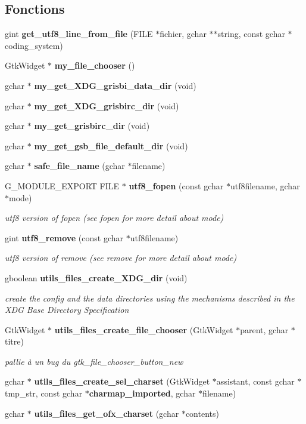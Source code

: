 \subsection*{Fonctions}
\begin{DoxyCompactItemize}
\item 
gint {\bf get\_\-utf8\_\-line\_\-from\_\-file} (FILE $\ast$fichier, gchar $\ast$$\ast$string, const gchar $\ast$coding\_\-system)
\item 
GtkWidget $\ast$ {\bf my\_\-file\_\-chooser} ()
\item 
gchar $\ast$ {\bf my\_\-get\_\-XDG\_\-grisbi\_\-data\_\-dir} (void)
\item 
gchar $\ast$ {\bf my\_\-get\_\-XDG\_\-grisbirc\_\-dir} (void)
\item 
gchar $\ast$ {\bf my\_\-get\_\-grisbirc\_\-dir} (void)
\item 
gchar $\ast$ {\bf my\_\-get\_\-gsb\_\-file\_\-default\_\-dir} (void)
\item 
gchar $\ast$ {\bf safe\_\-file\_\-name} (gchar $\ast$filename)
\item 
G\_\-MODULE\_\-EXPORT FILE $\ast$ {\bf utf8\_\-fopen} (const gchar $\ast$utf8filename, gchar $\ast$mode)
\begin{DoxyCompactList}\small\item\em utf8 version of fopen (see fopen for more detail about mode) \item\end{DoxyCompactList}\item 
gint {\bf utf8\_\-remove} (const gchar $\ast$utf8filename)
\begin{DoxyCompactList}\small\item\em utf8 version of remove (see remove for more detail about mode) \item\end{DoxyCompactList}\item 
gboolean {\bf utils\_\-files\_\-create\_\-XDG\_\-dir} (void)
\begin{DoxyCompactList}\small\item\em create the config and the data directories using the mechanisms described in the XDG Base Directory Specification \item\end{DoxyCompactList}\item 
GtkWidget $\ast$ {\bf utils\_\-files\_\-create\_\-file\_\-chooser} (GtkWidget $\ast$parent, gchar $\ast$titre)
\begin{DoxyCompactList}\small\item\em pallie à un bug du gtk\_\-file\_\-chooser\_\-button\_\-new \item\end{DoxyCompactList}\item 
gchar $\ast$ {\bf utils\_\-files\_\-create\_\-sel\_\-charset} (GtkWidget $\ast$assistant, const gchar $\ast$tmp\_\-str, const gchar $\ast${\bf charmap\_\-imported}, gchar $\ast$filename)
\item 
gchar $\ast$ {\bf utils\_\-files\_\-get\_\-ofx\_\-charset} (gchar $\ast$contents)
\end{DoxyCompactItemize}


